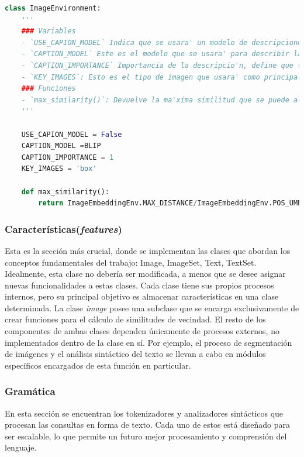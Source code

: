 \begin{lstlisting}[language=Python]
class ImageEnvironment:
    '''    
    ### Variables 
    - `USE_CAPION_MODEL` Indica que se usara' un modelo de descripciones de ima'genes
    - `CAPTION_MODEL` Este es el modelo que se usara' para describir la ima'gen
    - `CAPTION_IMPORTANCE` Importancia de la descripcio'n, define que tan importante ser la descripcio'n de una imagen para la similitud. Valor=1 indica que tiene igual importancia que la imagen.
    - `KEY_IMAGES`: Esto es el tipo de imagen que usara' como principal. (box or mask).
    ### Funciones
    - `max_similarity()`: Devuelve la ma'xima similitud que se puede alcanzar en la distancia entre dos ima'genes. 
    '''

    USE_CAPION_MODEL = False
    CAPTION_MODEL =BLIP
    CAPTION_IMPORTANCE = 1
    KEY_IMAGES = 'box'

    def max_similarity():
        return ImageEmbeddingEnv.MAX_DISTANCE/ImageEmbeddingEnv.POS_UMBRAL

\end{lstlisting}

\subsubsection{Caracter\'isticas(\textit{features})}
Esta es la sección m\'as crucial, donde se implementan las clases que abordan los conceptos fundamentales del trabajo: Image, ImageSet, Text, TextSet. Idealmente, esta clase no debería ser modificada, a menos que se desee asignar nuevas funcionalidades a estas clases. Cada clase tiene sus propios procesos internos, pero su principal objetivo es almacenar características en una clase determinada. 
La clase \textit{image } posee una subclase que se encarga exclusivamente de crear funciones para el c\'alculo de similitudes de vecindad. El resto de los componentes de ambas clases dependen únicamente de procesos externos, no implementados dentro de la clase en sí. Por ejemplo, el proceso de segmentación de im\'agenes y el an\'alisis sint\'actico del texto se llevan a cabo en módulos específicos encargados de esta función en particular.

\subsubsection{Gram\'atica}
En esta sección se encuentran los tokenizadores y analizadores sint\'acticos que procesan las consultas en forma de texto. Cada uno de estos est\'a diseñado para ser escalable, lo que permite un futuro mejor procesamiento y comprensión del lenguaje.

